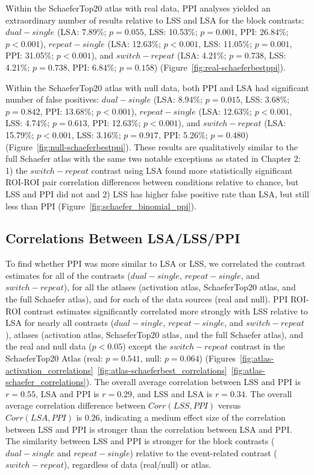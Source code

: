 \documentclass[phd,figures,tables,ackpage,abstractpage,publicabstractpage]{uithesis}
\begin{document}
Within the SchaeferTop20 atlas with real data, PPI analyses yielded an extraordinary number of results
relative to LSS and LSA for the block contrasts:
$dual - single$ (LSA: 7.89\%; $p = 0.055$, LSS: 10.53\%; $p = 0.001$, PPI: 26.84\%; $p < 0.001$),
$repeat - single$ (LSA: 12.63\%; $p < 0.001$, LSS: 11.05\%; $p = 0.001$, PPI: 31.05\%; $p < 0.001$), and
$switch - repeat$ (LSA: 4.21\%; $p = 0.738$, LSS: 4.21\%; $p = 0.738$, PPI: 6.84\%; $p = 0.158$) (Figure~\ref{fig:real-schaeferbestppi}).

Within the SchaeferTop20 atlas with null data, both PPI and LSA had significant number of false positives:
$dual - single$ (LSA: 8.94\%; $p = 0.015$, LSS: 3.68\%; $p = 0.842$, PPI: 13.68\%; $p < 0.001$),
$repeat - single$ (LSA: 12.63\%; $p < 0.001$, LSS: 4.74\%; $p = 0.613$, PPI: 12.63\%; $p < 0.001$), and
$switch - repeat$ (LSA: 15.79\%; $p < 0.001$, LSS: 3.16\%; $p = 0.917$, PPI: 5.26\%; $p = 0.480$) (Figure~\ref{fig:null-schaeferbestppi}).
These results are qualitatively similar to the full Schaefer atlas with the same two notable exceptions
as stated in Chapter 2:
1) the $switch - repeat$ contrast using LSA found more statistically significant
ROI-ROI pair correlation differences between conditions relative to chance,
but LSS and PPI did not and
2) LSS has higher false positive rate than LSA, but still less than PPI (Figure~\ref{fig:schaefer_binomial_ppi}).

\subsection{Correlations Between LSA/LSS/PPI}

To find whether PPI was more similar to LSA or LSS, we correlated the contrast estimates for all of the contrasts
($dual - single$, $repeat - single$, and $switch - repeat$),
for all the atlases (activation atlas, SchaeferTop20 atlas, and the full Schaefer atlas), and
for each of the data sources (real and null).
PPI ROI-ROI contrast estimates significantly correlated more strongly with LSS relative to LSA
for nearly all contrasts ($dual - single$, $repeat - single$, and $switch - repeat$),
atlases (activation atlas, SchaeferTop20 atlas, and the full Schaefer atlas),
and the real and null data ($p < 0.05$) except the $switch - repeat$
contrast in the SchaeferTop20 Atlas (real: $p = 0.541$, null: $p = 0.064$)
(Figures~\ref{fig:atlas-activation_correlations}~\ref{fig:atlas-schaeferbest_correlations}~\ref{fig:atlas-schaefer_correlations}).
The overall average correlation between LSS and PPI is $r = 0.55$, LSA and PPI is $r = 0.29$,
and LSS and LSA is $r = 0.34$.
The overall average correlation difference between $Corr(LSS, PPI)$ versus $Corr(LSA, PPI)$ is $0.26$,
indicating a medium effect size of the correlation between LSS and PPI is stronger than the
correlation between LSA and PPI.
The similarity between LSS and PPI is stronger for the block contrasts ($dual - single$ and $repeat - single$)
relative to the event-related contrast ($switch - repeat$), regardless of data (real/null) or atlas.
\end{document}
